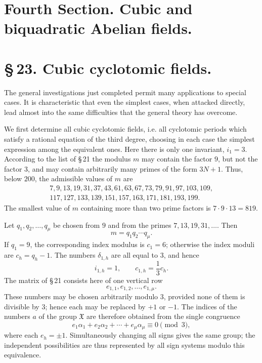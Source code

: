 \documentclass[11pt]{article}
\providecommand{\grpX}{\mathfrak X}
\begin{document}
\section*{Fourth Section. Cubic and biquadratic Abelian fields.}

\section*{\S\,23. Cubic cyclotomic fields.}

The general investigations just completed permit many applications to special cases.  It is characteristic that even the simplest cases, when attacked directly, lead almost into the same difficulties that the general theory has overcome.

We first determine all cubic cyclotomic fields, i.e. all cyclotomic periods which satisfy a rational equation of the third degree, choosing in each case the simplest expression among the equivalent ones.  Here there is only one invariant, $i_1=3$.  According to the list of \S\,21 the modulus $m$ may contain the factor $9$, but not the factor $3$, and may contain arbitrarily many primes of the form $3N+1$.  Thus, below $200$, the admissible values of $m$ are
\[
\begin{gathered}
7,9,13,19,31,37,43,61,63,67,73,79,91,97,103,109,\\
117,127,133,139,151,157,163,171,181,193,199.
\end{gathered}
\]
The smallest value of $m$ containing more than two prime factors is $7\cdot9\cdot13=819$.

Let $q_1,q_2,\ldots,q_\mu$ be chosen from $9$ and from the primes
$7,13,19,31,\ldots$.  Then
\begin{equation}
   m=q_1q_2\cdots q_\mu .
   \tag{1}
\end{equation}
If $q_1=9$, the corresponding index modulus is $c_1=6$; otherwise the index moduli are $c_h=q_h-1$.  The numbers $\delta_{1,h}$ are all equal to $3$, and hence
\[
   i_{1,h}=1,
   \qquad c_{1,h}=\frac13c_h .
\]
The matrix of \S\,21 consists here of one vertical row
\[
  e_{1,1},e_{1,2},\ldots,e_{1,\mu}.
\]
These numbers may be chosen arbitrarily modulo $3$, provided none of them is divisible by $3$; hence each may be replaced by $+1$ or $-1$.  The indices of the numbers $a$ of the group $\grpX$ are therefore obtained from the single congruence
\begin{equation}
   e_1\alpha_1+e_2\alpha_2+
   \cdots+e_\mu\alpha_\mu\equiv0\pmod3,
   \tag{2}
\end{equation}
where each $e_h=\pm1$.  Simultaneously changing all signs gives the same group; the independent possibilities are thus represented by all sign systems modulo this equivalence.
\end{document}
